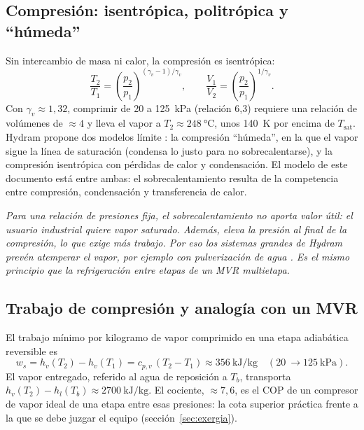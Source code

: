 \documentclass[11pt,a4paper]{article}
\newcommand{\Tsat}{T_{\mathrm{sat}}}
\newenvironment{nota}{\par\smallskip\noindent\begin{minipage}{\linewidth}\small\itshape}{\end{minipage}\par\smallskip}
\begin{document}
\subsection{Compresión: isentrópica, politrópica y ``húmeda''}

Sin intercambio de masa ni calor, la compresión es isentrópica:
\begin{equation}
\frac{T_2}{T_1} = \left(\frac{p_2}{p_1}\right)^{(\gamma_v-1)/\gamma_v},\qquad \frac{V_1}{V_2} = \left(\frac{p_2}{p_1}\right)^{1/\gamma_v}.
\end{equation}
Con $\gamma_v\approx 1{,}32$, comprimir de \SI{20}{} a \SI{125}{\kilo\pascal} (relación 6,3) requiere una relación de volúmenes de $\approx 4$ y lleva el vapor a $T_2\approx\SI{248}{\celsius}$, unos \SI{140}{\kelvin} por encima de $\Tsat$. Hydram propone dos modelos límite \cite{hydramtech}: la compresión ``húmeda'', en la que el vapor sigue la línea de saturación (condensa lo justo para no sobrecalentarse), y la compresión isentrópica con pérdidas de calor y condensación. El modelo de este documento está entre ambas: el sobrecalentamiento resulta de la competencia entre compresión, condensación y transferencia de calor.

\begin{nota}
Para una relación de presiones fija, el sobrecalentamiento no aporta valor útil: el usuario industrial quiere vapor saturado. Además, eleva la presión al final de la compresión, lo que exige más trabajo. Por eso los sistemas grandes de Hydram prevén atemperar el vapor, por ejemplo con pulverización de agua \cite{hydramtech}. Es el mismo principio que la refrigeración entre etapas de un MVR multietapa.
\end{nota}

\subsection{Trabajo de compresión y analogía con un MVR}

El trabajo mínimo por kilogramo de vapor comprimido en una etapa adiabática reversible es
\begin{equation}
w_s = h_v(T_2) - h_v(T_1) = c_{p,v}\,(T_2 - T_1) \approx \SI{356}{\kilo\joule\per\kilo\gram}\quad(\SI{20}{}\to\SI{125}{\kilo\pascal}).
\end{equation}
El vapor entregado, referido al agua de reposición a $T_b$, transporta $h_v(T_2)-h_l(T_b)\approx\SI{2700}{\kilo\joule\per\kilo\gram}$. El cociente, $\approx 7{,}6$, es el COP de un compresor de vapor ideal de una etapa entre esas presiones: la cota superior práctica frente a la que se debe juzgar el equipo (sección~\ref{sec:exergia}).
\end{document}
